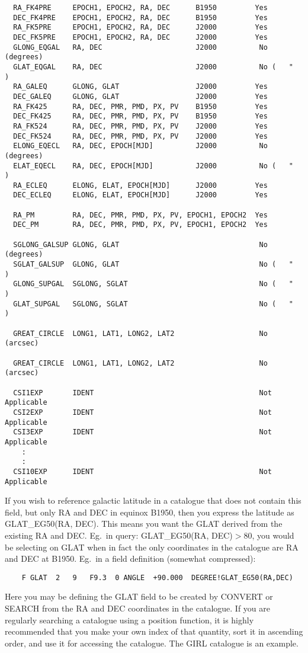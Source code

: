 \begin{description}
\begin{verbatim}
  RA_FK4PRE     EPOCH1, EPOCH2, RA, DEC      B1950         Yes
  DEC_FK4PRE    EPOCH1, EPOCH2, RA, DEC      B1950         Yes
  RA_FK5PRE     EPOCH1, EPOCH2, RA, DEC      J2000         Yes
  DEC_FK5PRE    EPOCH1, EPOCH2, RA, DEC      J2000         Yes
  GLONG_EQGAL   RA, DEC                      J2000          No (degrees)
  GLAT_EQGAL    RA, DEC                      J2000          No (   "   )
  RA_GALEQ      GLONG, GLAT                  J2000         Yes
  DEC_GALEQ     GLONG, GLAT                  J2000         Yes
  RA_FK425      RA, DEC, PMR, PMD, PX, PV    B1950         Yes
  DEC_FK425     RA, DEC, PMR, PMD, PX, PV    B1950         Yes
  RA_FK524      RA, DEC, PMR, PMD, PX, PV    J2000         Yes
  DEC_FK524     RA, DEC, PMR, PMD, PX, PV    J2000         Yes
  ELONG_EQECL   RA, DEC, EPOCH[MJD]          J2000          No (degrees)
  ELAT_EQECL    RA, DEC, EPOCH[MJD]          J2000          No (   "   )
  RA_ECLEQ      ELONG, ELAT, EPOCH[MJD]      J2000         Yes
  DEC_ECLEQ     ELONG, ELAT, EPOCH[MJD]      J2000         Yes

  RA_PM         RA, DEC, PMR, PMD, PX, PV, EPOCH1, EPOCH2  Yes
  DEC_PM        RA, DEC, PMR, PMD, PX, PV, EPOCH1, EPOCH2  Yes

  SGLONG_GALSUP GLONG, GLAT                                 No (degrees)
  SGLAT_GALSUP  GLONG, GLAT                                 No (   "   )
  GLONG_SUPGAL  SGLONG, SGLAT                               No (   "   )
  GLAT_SUPGAL   SGLONG, SGLAT                               No (   "   )

  GREAT_CIRCLE  LONG1, LAT1, LONG2, LAT2                    No (arcsec)

  GREAT_CIRCLE  LONG1, LAT1, LONG2, LAT2                    No (arcsec)

  CSI1EXP       IDENT                                       Not Applicable
  CSI2EXP       IDENT                                       Not Applicable
  CSI3EXP       IDENT                                       Not Applicable
    :
    :
  CSI10EXP      IDENT                                       Not Applicable

\end{verbatim}
If you wish to reference galactic latitude in a catalogue that does not contain
this field, but only RA and DEC in equinox B1950, then you express the latitude
as GLAT\_EG50(RA, DEC).
This means you want the GLAT derived from the existing RA and DEC.
Eg.\ in query: GLAT\_EG50(RA, DEC)$>$80, you would be selecting on GLAT
when in fact the only coordinates in the catalogue are RA and DEC at B1950.
Eg.\ in a field definition (somewhat compressed):
\begin{verbatim}
    F GLAT  2   9   F9.3  0 ANGLE  +90.000  DEGREE!GLAT_EG50(RA,DEC)
\end{verbatim}
Here you may be defining the GLAT field to be created by CONVERT or SEARCH from
the RA and DEC coordinates in the catalogue.
If you are regularly searching a catalogue using a position function, it is
highly recommended that you make your own index of that quantity, sort it in
ascending order, and use it for accessing the catalogue.
The GIRL catalogue is an example.


\end{description}
